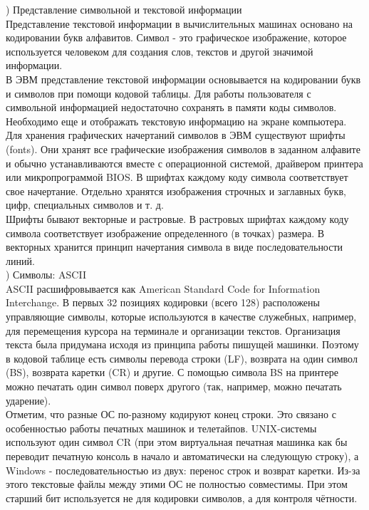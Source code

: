 ) Представление символьной и текстовой
информации \\
Представление текстовой информации в вычислительных машинах основано на кодировании букв алфавитов. Символ - это графическое изображение, которое используется человеком для создания слов, текстов и другой значимой информации. \\
В ЭВМ представление текстовой информации основывается на кодировании букв и символов при помощи кодовой таблицы. Для работы пользователя с символьной информацией недостаточно сохранять в памяти коды символов. Необходимо еще и отображать текстовую информацию на экране компьютера. Для хранения графических начертаний символов в ЭВМ существуют шрифты (fonts). Они хранят все графические изображения символов в заданном алфавите и обычно устанавливаются вместе с операционной системой, драйвером принтера или микропрограммой BIOS. В шрифтах каждому коду символа соответствует свое начертание. Отдельно хранятся изображения строчных и заглавных букв, цифр, специальных символов и т. д. \\
Шрифты бывают векторные и растровые. В растровых шрифтах каждому коду символа соответствует изображение определенного (в точках) размера. В векторных хранится принцип начертания символа в виде последовательности линий. \\

) Символы: ASCII \\
\noindent ASCII расшифровывается как American Standard Code for Information Interchange. В первых 32 позициях кодировки (всего 128) расположены управляющие символы, которые используются в качестве служебных, например, для перемещения курсора на терминале и организации текстов.
Организация текста была придумана исходя из принципа работы пишущей машинки. Поэтому в кодовой таблице есть символы перевода строки (LF), возврата на один символ (BS), возврата каретки (CR) и другие. С помощью символа BS на принтере можно печатать один символ поверх другого (так, например, можно печатать ударение). \\
Отметим, что разные ОС по-разному кодируют конец строки. Это связано с особенностью работы печатных машинок и телетайпов. UNIX-системы используют один символ CR (при этом виртуальная печатная машинка как бы переводит печатную консоль в начало и автоматически на следующую строку), а Windows - последовательностью из двух: перенос строк и возврат каретки. Из-за этого текстовые файлы между этими ОС не полностью совместимы. При этом старший бит используется не для кодировки символов, а для контроля чётности. \\

